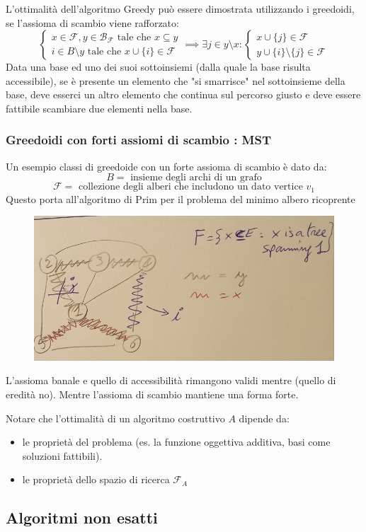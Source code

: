 \documentclass{article}
\begin{document}
    L'ottimalità dell'algoritmo Greedy può essere dimostrata utilizzando i greedoidi,
    se l'assioma di scambio viene rafforzato:
    \[
        \begin{cases}
            x\in\mathcal{F},y\in\mathcal{B}_\mathcal{F}\text{ tale che } x\subseteq y \\
            i\in B\setminus y\text{ tale che } x\cup\{i\}\in\mathcal{F}
        \end{cases}
        \implies
        \exists j\in y\setminus x :
        \begin{cases}
            x\cup\{j\}\in\mathcal{F} \\
            y\cup\{i\}\setminus\{j\}\in\mathcal{F}
        \end{cases}
    \]
    Data una base ed uno dei suoi sottoinsiemi (dalla quale la base risulta
    accessibile), se è presente un elemento che "si smarrisce" nel sottoinsieme della base,
    deve esserci un altro elemento che continua sul percorso giusto e deve essere
    fattibile scambiare due elementi nella base.
    \subsubsection{Greedoidi con forti assiomi di scambio : MST}
    Un esempio classi di greedoide con un forte assioma di scambio è dato da:
    $$B=\text{ insieme degli archi di un grafo}$$
    $$\mathcal{F}=\text{ collezione degli alberi che includono un dato vertice } v_1$$
    Questo porta all'algoritmo di Prim per il problema del minimo albero ricoprente
    \begin{figure}[H]
        \centering
        \includegraphics[scale=0.5]{images/greedoid_mst.png}
    \end{figure}
    L'assioma banale e quello di accessibilità rimangono validi mentre (quello
    di eredità no). Mentre l'assioma di scambio mantiene una forma forte.

    Notare che l'ottimalità di un algoritmo costruttivo $A$ dipende da:
\begin{itemize}
    \item le proprietà del problema (es. la funzione oggettiva additiva, basi
          come soluzioni fattibili).
    \item le proprietà dello spazio di ricerca $\mathcal{F}_A$
\end{itemize}

\subsection{Algoritmi non esatti}
\end{document}
